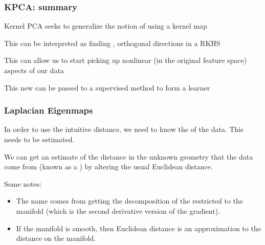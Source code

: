 \documentclass{beamer}
\begin{document}
\begin{frame}
  \frametitle{KPCA: summary}
Kernel PCA seeks to generalize the notion of  using a kernel map

\vsp
This can be interpreted as finding , orthogonal directions in a RKHS

\vsp
This can allow us to start picking up nonlinear (in the original feature space) aspects of our data

\vsp
This new  can be passed to a supervised method to form  a  learner
\end{frame}
\begin{frame}[fragile]
  \frametitle{Laplacian Eigenmaps}
  In order to use the intuitive distance, we need to know the  of the data.  This needs to be estimated.
  \vsp
  
  We can get an estimate of the distance in the unknown geometry that
  the data come from (known as a ) by altering the
  usual Euclidean distance. 
  
  \vsp
  Some notes:
  \begin{itemize}
  \item The name  comes from getting the
     decomposition of the  restricted to the
    manifold (which is the second derivative version of the gradient).
  \item If the manifold is smooth, then  Euclidean distance is an approximation
  to the distance on the manifold.
    \end{itemize}
\end{frame}




%
\end{document}
